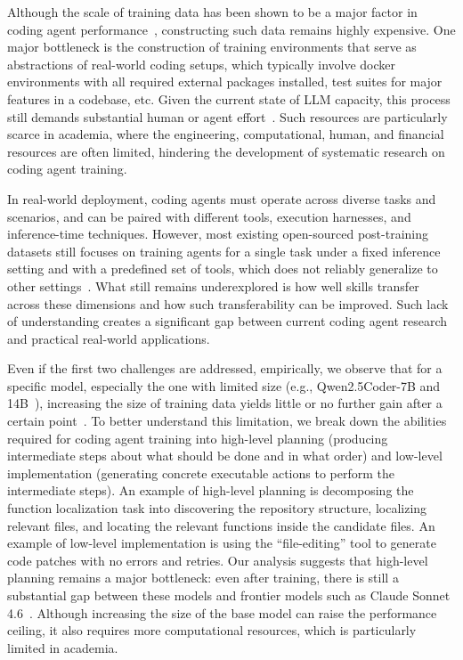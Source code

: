 \documentclass[12pt,openany]{cmuthesis}
\begin{document}
Although the scale of training data has been shown to be a major factor in coding agent performance~\cite{swe-smith}, constructing such data remains highly expensive.
One major bottleneck is the construction of training environments that serve as abstractions of real-world coding setups, which typically involve docker environments with all required external packages installed, test suites for major features in a codebase, etc. 
Given the current state of LLM capacity, this process still demands substantial human or agent effort~\cite{swe-smith}.
Such resources are particularly scarce in academia, where the engineering, computational, human, and financial resources are often limited, hindering the development of systematic research on coding agent training.

In real-world deployment, coding agents must operate across diverse tasks and scenarios, and can be paired with different tools, execution harnesses, and inference-time techniques.
However, most existing open-sourced post-training datasets still focuses on training agents for a single task under a fixed inference setting and with a predefined set of tools, which does not reliably generalize to other settings~\cite{swe-play}.
What still remains underexplored is how well skills transfer across these dimensions and how such transferability can be improved.
Such lack of understanding creates a significant gap between current coding agent research and practical real-world applications.

Even if the first two challenges are addressed, empirically, we observe that for a specific model, especially the one with limited size (e.g., Qwen2.5Coder-7B and 14B~\cite{qwen25coder}), increasing the size of training data yields little or no further gain after a certain point~\cite{swe-smith,R2EGym}.
To better understand this limitation, we break down the abilities required for coding agent training into high-level planning (producing intermediate steps about what should be done and in what order) and low-level implementation (generating concrete executable actions to perform the intermediate steps).
An example of high-level planning is decomposing the function localization task into discovering the repository structure, localizing relevant files, and locating the relevant functions inside the candidate files.
An example of low-level implementation is using the ``file-editing'' tool to generate code patches with no errors and retries.
Our analysis suggests that high-level planning remains a major bottleneck: even after training, there is still a substantial gap between these models and frontier models such as Claude Sonnet 4.6~\cite{claude46}.
Although increasing the size of the base model can raise the performance ceiling, it also requires more computational resources, which is particularly limited in academia.
\end{document}
